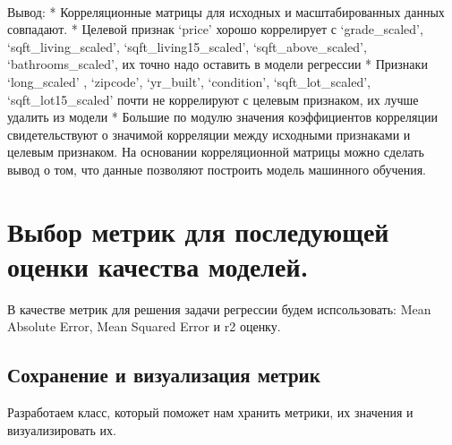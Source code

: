 \documentclass[11pt]{report}
\begin{document}
    \begin{center}
    \end{center}
    { \hspace*{\fill} \\}
    
    Вывод: * Корреляционные матрицы для исходных и масштабированных данных
совпадают. * Целевой признак `price' хорошо коррелирует с
`grade\_scaled', `sqft\_living\_scaled', `sqft\_living15\_scaled',
`sqft\_above\_scaled', `bathrooms\_scaled', их точно надо оставить в
модели регрессии * Признаки `long\_scaled' , `zipcode', `yr\_built',
`condition', `sqft\_lot\_scaled', `sqft\_lot15\_scaled' почти не
коррелируют с целевым признаком, их лучше удалить из модели * Большие по
модулю значения коэффициентов корреляции свидетельствуют о значимой
корреляции между исходными признаками и целевым признаком. На основании
корреляционной матрицы можно сделать вывод о том, что данные позволяют
построить модель машинного обучения.

\chapter{Выбор метрик для последующей оценки качества
моделей.}

    В качестве метрик для решения задачи регрессии будем испсользовать: Mean
Absolute Error, Mean Squared Error и r2 оценку.

\section{Сохранение и визуализация метрик}

    Разработаем класс, который поможет нам хранить метрики, их значения и
визуализировать их.
\end{document}
